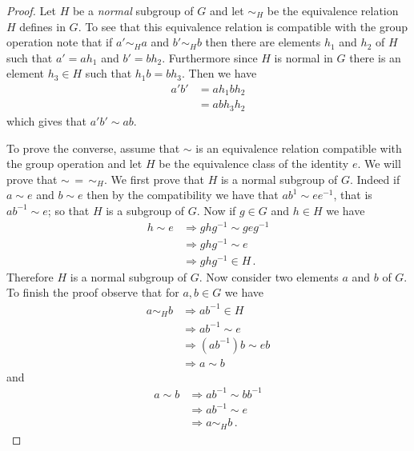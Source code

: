 \documentclass[12pt]{article}
\theoremstyle{definition}
\theoremstyle{remark}
\numberwithin{equation}{subsection}
\begin{document}
\begin{proof}

  Let $H$ be a \emph{normal} subgroup of $G$ and let $\sim_H$ be the
  equivalence relation $H$ defines in $G$.  To see that this
  equivalence relation is compatible with the group operation note
  that if $a'\sim_H a$ and $b'\sim_H b$ then there are elements $h_1$
  and $h_2$ of $H$ such that $a' = ah_1$ and $b' = b
  h_2$. Furthermore since $H$ is normal in $G$ there is an element
  $h_3\in H$ such that $h_1b = bh_3$.  Then we have
\begin{align*}
  a'b'&=ah_1bh_2 \\
      &=abh_3h_2 
\end{align*}
which gives that $a'b'\sim ab$.

  To prove the converse,  assume that $\sim$ is an
  equivalence relation compatible with the group operation and let
  $H$ be the equivalence class of the identity $e$.  We will prove
  that $\sim \,= \,\sim_H$. We first prove
  that $H$ is a normal subgroup of $G$.  Indeed if $a\sim e$ and $b
  \sim e$ then by the compatibility we have that $ab^{1} \sim ee^{-1}$, that
  is $ab^{-1}\sim e$; so that $H$ is a subgroup of $G$.  Now if
  $g\in G$ and $h\in H$ we have 
  \begin{align*}
    h\sim e &\Rightarrow ghg^{-1} \sim geg^{-1}\\
            &\Rightarrow ghg^{-1} \sim e\\            
            &\Rightarrow ghg^{-1} \in H\,.
  \end{align*}
 Therefore $H$ is a normal subgroup of $G$.  Now consider two
 elements $a$ and $b$ of $G$.  To finish the proof observe that for
 $a,b\in G$ we have
 \begin{align*}
   a\sim_H b   &\Rightarrow ab^{-1}\in H\\ 
               &\Rightarrow ab^{-1} \sim e\\
               &\Rightarrow (ab^{-1})b \sim eb\\ 
               &\Rightarrow a \sim b 
 \end{align*}
and
 \begin{align*}
   a\sim b &\Rightarrow ab^{-1} \sim bb^{-1}\\
               &\Rightarrow ab^{-1} \sim e\\
               &\Rightarrow a\sim_H b\,.
 \end{align*}
\end{proof}
\end{document}
